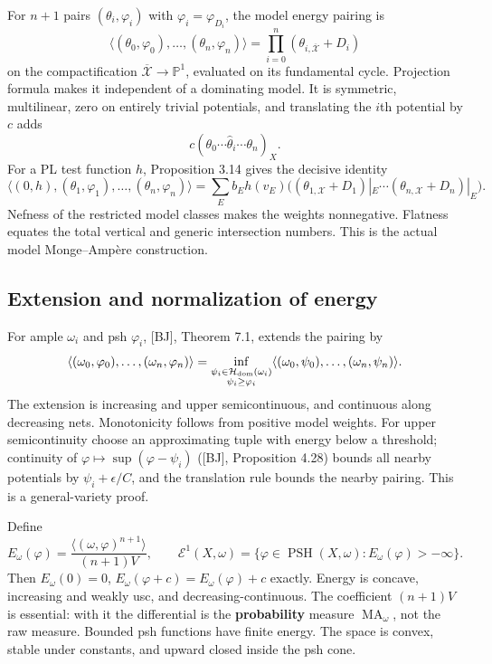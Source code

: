 \documentclass[11pt]{article}
\begin{document}
For \(n+1\) pairs \((\theta_i,\varphi_i)\) with
\(\varphi_i=\varphi_{D_i}\), the model energy pairing is
\[\langle(\theta_0,\varphi_0),\ldots,(\theta_n,\varphi_n)\rangle
=\prod_{i=0}^n(\theta_{i,\overline{\mathcal X}}+D_i)\] on the
compactification \(\overline{\mathcal X}\to\mathbb P^1\), evaluated on
its fundamental cycle. Projection formula makes it independent of a
dominating model. It is symmetric, multilinear, zero on entirely trivial
potentials, and translating the \(i\)th potential by \(c\) adds
\[c(\theta_0\cdots\widehat\theta_i\cdots\theta_n)_X.\] For a PL test
function \(h\), Proposition 3.14 gives the decisive identity
\[\langle(0,h),(\theta_1,\varphi_1),\ldots,(\theta_n,\varphi_n)\rangle
=\sum_E b_E h(v_E)\big((\theta_{1,\mathcal X}+D_1)|_E\cdots(\theta_{n,\mathcal X}+D_n)|_E\big).\]
Nefness of the restricted model classes makes the weights nonnegative.
Flatness equates the total vertical and generic intersection numbers.
This is the actual model Monge--Ampère construction.

\subsection{Extension and normalization of
energy}\label{extension-and-normalization-of-energy}

For ample \(\omega_i\) and psh \(\varphi_i\), {[}BJ{]}, Theorem 7.1,
extends the pairing by
\[\langle(\omega_0,\varphi_0),\ldots,(\omega_n,\varphi_n)\rangle
=\inf_{\substack{\psi_i\in\mathcal H_{\rm dom}(\omega_i)\\\psi_i\geq\varphi_i}}
\langle(\omega_0,\psi_0),\ldots,(\omega_n,\psi_n)\rangle.\] The
extension is increasing and upper semicontinuous, and continuous along
decreasing nets. Monotonicity follows from positive model weights. For
upper semicontinuity choose an approximating tuple with energy below a
threshold; continuity of \(\varphi\mapsto\sup(\varphi-\psi_i)\)
({[}BJ{]}, Proposition 4.28) bounds all nearby potentials by
\(\psi_i+\epsilon/C\), and the translation rule bounds the nearby
pairing. This is a general-variety proof.

Define
\[E_\omega(\varphi)=\frac{\langle(\omega,\varphi)^{n+1}\rangle}{(n+1)V},\qquad
\mathcal E^1(X,\omega)=\{\varphi\in\operatorname{PSH}(X,\omega):E_\omega(\varphi)>-\infty\}.\]
Then \(E_\omega(0)=0\), \(E_\omega(\varphi+c)=E_\omega(\varphi)+c\)
exactly. Energy is concave, increasing and weakly usc, and
decreasing-continuous. The coefficient \((n+1)V\) is essential: with it
the differential is the \textbf{probability} measure
\(\operatorname{MA}_\omega\), not the raw measure. Bounded psh functions
have finite energy. The space is convex, stable under constants, and
upward closed inside the psh cone.
\end{document}
